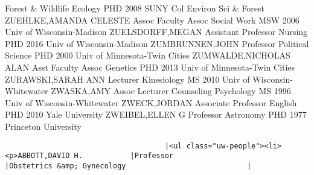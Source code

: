 \documentclass[
]{article}
\begin{document}
\textbar Forest \& Wildlife Ecology \textbar PHD 2008 SUNY Col Environ
Sci \& Forest \textbar{}  \textbar ZUEHLKE,AMANDA CELESTE
\textbar Assoc Faculty Assoc \textbar Social Work \textbar MSW 2006 Univ
of Wisconsin-Madison \textbar{}  \textbar ZUELSDORFF,MEGAN
\textbar Assistant Professor \textbar Nursing \textbar PHD 2016 Univ of
Wisconsin-Madison \textbar{}  \textbar ZUMBRUNNEN,JOHN
\textbar Professor \textbar Political Science \textbar PHD 2000 Univ of
Minnesota-Twin Cities \textbar{}  \textbar ZUMWALDE,NICHOLAS
ALAN \textbar Asst Faculty Assoc \textbar Genetics \textbar PHD 2013
Univ of Minnesota-Twin Cities \textbar{} 
\textbar ZURAWSKI,SARAH ANN \textbar Lecturer \textbar Kinesiology
\textbar MS 2010 Univ of Wisconsin-Whitewater \textbar{} 
\textbar ZWASKA,AMY \textbar Assoc Lecturer \textbar Counseling
Psychology \textbar MS 1996 Univ of Wisconsin-Whitewater \textbar{}
 \textbar ZWECK,JORDAN \textbar Associate Professor
\textbar English \textbar PHD 2010 Yale University \textbar{}
 \textbar ZWEIBEL,ELLEN G \textbar Professor
\textbar Astronomy \textbar PHD 1977 Princeton University \textbar{}
 \textbar{}

\begin{verbatim}
                                     |<ul class="uw-people"><li><p>ABBOTT,DAVID H.           |Professor                                              |Obstetrics &amp; Gynecology                            |
\end{verbatim}
\end{document}

